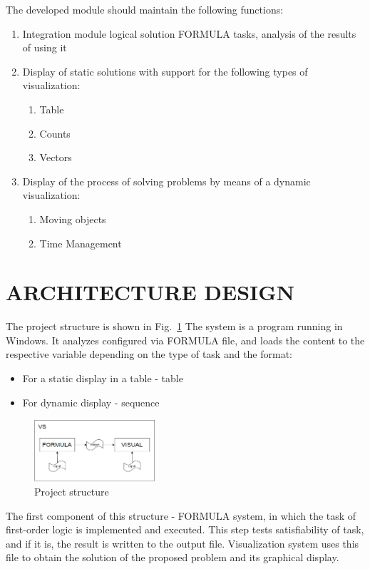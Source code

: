 \documentclass[a4paper, 10pt, conference]{ieeeconf}
\begin{document}
The developed module should maintain the following functions:
\begin{enumerate}
\item Integration module logical solution FORMULA tasks, analysis of the results of using it
\item Display of static solutions with support for the following types of visualization:
\begin{enumerate}
\item Table
\item Counts
\item Vectors
\end{enumerate}
\item Display of the process of solving problems by means of a dynamic visualization:
\begin{enumerate}
\item Moving objects
\item Time Management
\end{enumerate}
\end{enumerate}

\section{ARCHITECTURE DESIGN}

The project structure is shown in Fig.~\ref{fig:structure}
The system is a program running in Windows. It analyzes configured via FORMULA file, and loads the content to the respective variable depending on the type of task and the format:
\begin{itemize}
\item For a static display in a table - table
\item For dynamic display - sequence
\end{itemize}
\begin{figure}[h]
    \centering
    \includegraphics[width=0.4\textwidth]{structure.png}
    \caption{Project structure}
    \label{fig:structure}
\end{figure}

The first component of this structure - FORMULA system, in which the task of first-order logic is implemented and executed. This step tests satisfiability of task, and if it is, the result is written to the output file. Visualization system uses this file to obtain the solution of the proposed problem and its graphical display.\\
\end{document}
